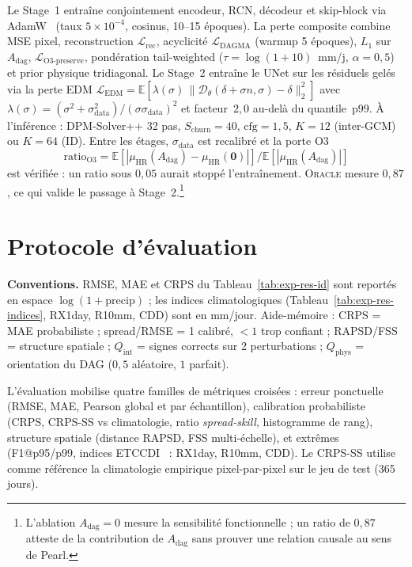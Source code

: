 \documentclass[14pt,a4paper,openany]{extreport}
\newcommand{\Oracle}{\textsc{Oracle}}
\newcommand{\HR}{\ensuremath{\text{HR}}}
\newcommand{\muHR}{\ensuremath{\mu_{\HR}}}
\newcommand{\Adag}{\ensuremath{A_{\mathrm{dag}}}}
\begin{document}
Le Stage~1 entraîne conjointement encodeur, RCN, décodeur et skip-block via AdamW~\cite{loshchilov_adamw_2019} (taux $5 \times 10^{-4}$, cosinus, 10--15 époques). La perte composite combine MSE pixel, reconstruction $\mathcal{L}_{\mathrm{rec}}$, acyclicité $\mathcal{L}_{\mathrm{DAGMA}}$ (warmup 5 époques), $L_1$ sur $\Adag$, $\mathcal{L}_{\mathrm{O3\text{-}preserve}}$, pondération tail-weighted ($\tau = \log(1+10)$~mm/j, $\alpha=0{,}5$) et prior physique tridiagonal. Le Stage~2 entraîne le UNet sur les résiduels gelés via la perte EDM $\mathcal{L}_{\mathrm{EDM}} = \mathbb{E}[\lambda(\sigma)\,\|\mathcal{D}_\theta(\delta+\sigma n,\sigma)-\delta\|_2^2]$ avec $\lambda(\sigma)=(\sigma^2+\sigma_{\mathrm{data}}^2)/(\sigma\sigma_{\mathrm{data}})^2$ et facteur~$2{,}0$ au-delà du quantile~p99. À l'inférence : DPM-Solver++ 32 pas, $S_{\mathrm{churn}}=40$, $\mathrm{cfg}=1{,}5$, $K=12$ (inter-GCM) ou $K=64$ (ID). Entre les étages, $\sigma_{\mathrm{data}}$ est recalibré et la porte O3
\begin{equation}
  \mathrm{ratio}_{\mathrm{O3}} = \mathbb{E}\left[ \left\vert \muHR(\Adag) - \muHR(\mathbf{0}) \right\vert \right] / \mathbb{E}\left[ \left\vert \muHR(\Adag) \right\vert \right]
  \label{eq:exp-gate-o3}
\end{equation}
est vérifiée : un ratio sous $0{,}05$ aurait stoppé l'entraînement. \Oracle{} mesure $0{,}87$, ce qui valide le passage à Stage~2.\footnote{L'ablation $\Adag=0$ mesure la sensibilité fonctionnelle ; un ratio de $0{,}87$ atteste de la contribution de $\Adag$ sans prouver une relation causale au sens de Pearl.}

\section{Protocole d'évaluation}
\label{sec:exp-protoc}

\textbf{Conventions.} RMSE, MAE et CRPS du Tableau~\ref{tab:exp-res-id} sont reportés en espace $\log(1+\mathrm{precip})$ ; les indices climatologiques (Tableau~\ref{tab:exp-res-indices}, RX1day, R10mm, CDD) sont en mm/jour. Aide-mémoire : CRPS = MAE probabiliste ; spread/RMSE = 1 calibré, $<1$ trop confiant ; RAPSD/FSS = structure spatiale ; $Q_{\mathrm{int}}$ = signes corrects sur 2 perturbations ; $Q_{\mathrm{phys}}$ = orientation du DAG ($0{,}5$ aléatoire, $1$ parfait).

L'évaluation mobilise quatre familles de métriques croisées : erreur ponctuelle (RMSE, MAE, Pearson global et par échantillon), calibration probabiliste (CRPS, CRPS-SS vs climatologie, ratio \emph{spread-skill}, histogramme de rang), structure spatiale (distance RAPSD, FSS multi-échelle), et extrêmes (F1@p95/p99, indices ETCCDI~\cite{zhang_etccdi_2011} : RX1day, R10mm, CDD). Le CRPS-SS utilise comme référence la climatologie empirique pixel-par-pixel sur le jeu de test (365 jours).
\end{document}
